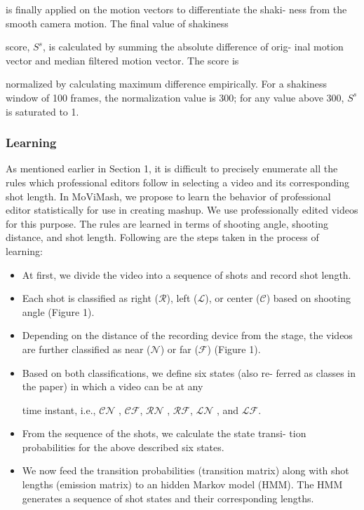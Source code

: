 \documentclass{sig-alternate}
\begin{document}
is finally applied on the motion vectors to differentiate the shaki-
ness from the smooth camera motion. The final value of shakiness

score, $S^s$, is calculated by summing the absolute difference of orig-
inal motion vector and median filtered motion vector. The score is

normalized by calculating maximum difference empirically. For a
shakiness window of 100 frames, the normalization value is 300;
for any value above 300, $S^s$ is saturated to 1.

\subsubsection{Learning}
As mentioned earlier in Section 1, it is difficult to precisely enumerate all the rules which professional editors follow in selecting a video and its corresponding shot length. In MoViMash, we propose to learn the behavior of professional editor statistically for use in creating mashup. We use professionally edited videos for this purpose. The rules are learned in terms of shooting angle, shooting distance, and shot length. Following are the steps taken in the process of learning:
\begin{itemize}
\item At first, we divide the video into a sequence of shots and
record shot length.
\item Each shot is classified as right ($\mathcal{R}$), left ($\mathcal{L}$), or center ($\mathcal{C}$)
based on shooting angle (Figure 1).
\item Depending on the distance of the recording device from the
stage, the videos are further classified as near ($\mathcal{N}$) or far ($\mathcal{F}$)
(Figure 1).

\item Based on both classifications, we define six states (also re-
ferred as classes in the paper) in which a video can be at any

time instant, i.e., $\mathcal{CN}$ , $\mathcal{CF}$, $\mathcal{RN}$ , $\mathcal{RF}$, $\mathcal{LN}$ , and $\mathcal{LF}$.

\item From the sequence of the shots, we calculate the state transi-
tion probabilities for the above described six states.

\item We now feed the transition probabilities (transition matrix)
along with shot lengths (emission matrix) to an hidden Markov
model (HMM). The HMM generates a sequence of shot states
and their corresponding lengths.
\end{itemize}
\end{document}

